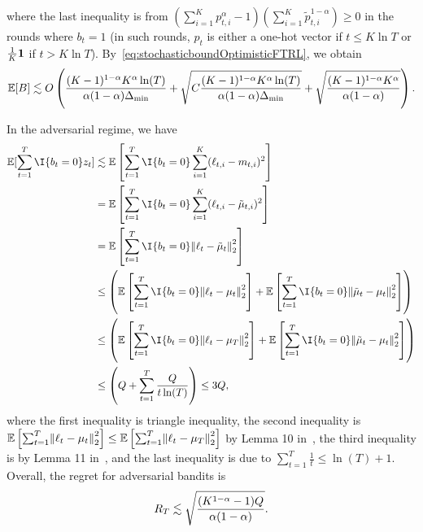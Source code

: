 where the last inequality is from $\left(\sum_{i=1}^K p_{t,i}^\alpha - 1\right)\left(\sum_{i=1}^K \tilde{p}_{t,i}^{1-\alpha}\right) \geq 0$ in the rounds where $b_t = 1$ (in such rounds, $p_t$ is either a one-hot vector if $t \leq K\ln{T}$ or $\frac{1}{K}\bm{1}$ if $t > K\ln{T}$). 
By~\eqref{eq:stochasticboundOptimisticFTRL}, we obtain
\begin{align*}
    \mathbb{E}[B] \lesssim O\left(\frac{(K-1)^{1-\alpha}K^\alpha \ln(T)}{\alpha(1-\alpha)\Delta_{\min}} + \sqrt{C\frac{(K-1)^{1-\alpha}K^\alpha \ln(T)}{\alpha(1-\alpha)\Delta_{\min}}} + \sqrt{\frac{(K-1)^{1-\alpha}K^{\alpha}}{\alpha(1-\alpha)}}\right).
\end{align*}

In the adversarial regime, we have
\begin{align*}
    \E[\sum_{t=1}^T \I{b_t = 0}z_t] &\lesssim \E\left[\sum_{t=1}^T \I{b_t = 0}\sum_{i=1}^K (\ell_{t,i} - m_{t,i})^2\right] \\
    &= \E\left[\sum_{t=1}^T \I{b_t = 0}\sum_{i=1}^K(\ell_{t,i} - \tilde{\mu}_{t,i})^2 \right] \\
    &=  \E\left[\sum_{t=1}^T \I{b_t = 0}\norm{\ell_{t} - \tilde{\mu}_{t}}_2^2 \right] \\
    &\leq \left(\E\left[\sum_{t=1}^T \I{b_t = 0}\norm{\ell_{t} - \mu_{t}}_2^2 \right] + \E\left[\sum_{t=1}^T \I{b_t = 0}\norm{\tilde{\mu}_t - \mu_{t}}_2^2 \right]\right) \\
    &\leq \left(\E\left[\sum_{t=1}^T \I{b_t = 0}\norm{\ell_{t} - \mu_{T}}_2^2 \right] + \E\left[\sum_{t=1}^T \I{b_t = 0}\norm{\tilde{\mu}_t - \mu_{t}}_2^2 \right]\right) \\
    &\leq \left(Q + \sum_{t=1}^T \frac{Q}{t\ln(T)}\right) \leq 3 Q,
\end{align*}
 where the first inequality is triangle inequality, the second inequality is $\mathbb{E}\left[\sum_{t=1}^T \norm{\ell_{t} - \mu_{t}}_2^2 \right] \leq \mathbb{E}\left[\sum_{t=1}^T \norm{\ell_{t} - \mu_{T}}_2^2 \right]$ by Lemma 10 in~\cite{HazanAndKale11a}, the third inequality is by Lemma 11 in~\cite{HazanAndKale11a}, and the last inequality is due to $\sum_{t=1}^T \frac{1}{t} \leq \ln(T) + 1$.
Overall, the regret for adversarial bandits is
\begin{align*}
    R_T \lesssim \sqrt{\frac{(K^{1-\alpha}-1) Q}{\alpha(1-\alpha)}}.
\end{align*}

